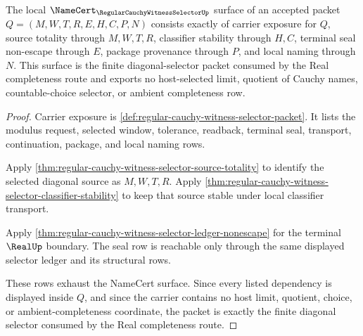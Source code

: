 \begin{theorem}
\label{thm:regular-cauchy-witness-selector-namecert-surface}
The local $\NameCert_{\RegularCauchyWitnessSelectorUp}$ surface of an accepted packet $Q=(M,W,T,R,E,H,C,P,N)$ consists exactly of carrier exposure for $Q$, source totality through $M,W,T,R$, classifier stability through $H,C$, terminal seal non-escape through $E$, package provenance through $P$, and local naming through $N$. This surface is the finite diagonal-selector packet consumed by the Real completeness route and exports no host-selected limit, quotient of Cauchy names, countable-choice selector, or ambient completeness row.
\end{theorem}
\begin{proof}
Carrier exposure is \autoref{def:regular-cauchy-witness-selector-packet}. It lists the modulus request, selected window, tolerance, readback, terminal seal, transport, continuation, package, and local naming rows.

Apply \autoref{thm:regular-cauchy-witness-selector-source-totality} to identify the selected diagonal source as $M,W,T,R$. Apply \autoref{thm:regular-cauchy-witness-selector-classifier-stability} to keep that source stable under local classifier transport.

Apply \autoref{thm:regular-cauchy-witness-selector-ledger-nonescape} for the terminal $\RealUp$ boundary. The seal row is reachable only through the same displayed selector ledger and its structural rows.

These rows exhaust the NameCert surface. Since every listed dependency is displayed inside $Q$, and since the carrier contains no host limit, quotient, choice, or ambient-completeness coordinate, the packet is exactly the finite diagonal selector consumed by the Real completeness route.
\end{proof}

